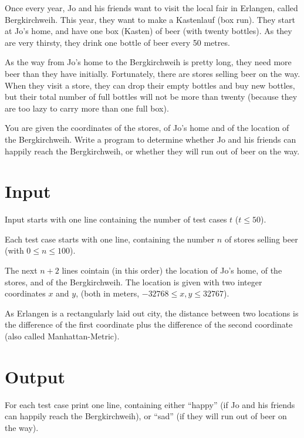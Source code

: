 
Once every year, Jo and his friends want to visit the local fair in
Erlangen, called Bergkirchweih. This year, they want to make a
Kastenlauf (box run). They start at Jo's home, and have one box
(Kasten) of beer (with twenty bottles). As they are very thirsty, they
drink one bottle of beer every 50 metres.

As the way from Jo's home to the Bergkirchweih is pretty long, they
need more beer than they have initially. Fortunately, there are stores
selling beer on the way. When they visit a store, they can drop their
empty bottles and buy new bottles, but their total number of full
bottles will not be more than twenty (because they are too lazy to
carry more than one full box).

You are given the coordinates of the stores, of Jo's home and of the
location of the Bergkirchweih. Write a program to determine whether Jo
and his friends can happily reach the Bergkirchweih, or whether they
will run out of beer on the way. 

\section*{Input}
Input starts with one line containing the number of test cases $t$ ($t \leq 50$).

Each test case starts with one line, containing the number $n$ of stores
selling beer (with $0 \leq n \leq 100$).

The next $n+2$ lines cointain (in this order) the location of Jo's
home, of the stores, and of the Bergkirchweih. The location is given
with two integer coordinates $x$ and $y$, (both in meters, $-32768
\leq x, y \leq 32767$).

As Erlangen is a rectangularly laid out city, the distance between two
locations is the difference of the first coordinate plus the
difference of the second coordinate (also called Manhattan-Metric).

\section*{Output}
  For each test case print one line, containing either ``happy'' (if Jo
  and his friends can happily reach the Bergkirchweih), or ``sad''
  (if they will run out of beer on the way).
